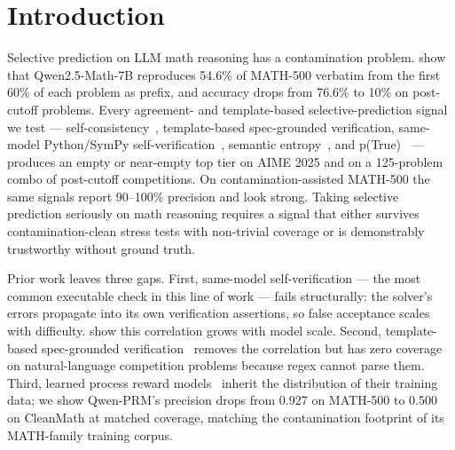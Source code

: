 \documentclass{article}
\renewcommand{\headrulewidth}{0pt}%
\begin{document}
\printAffiliationsAndNotice{}

\thispagestyle{icml}
\pagestyle{icml}
\fancyhf{}
\renewcommand{\headrulewidth}{0pt}

\section{Introduction}

Selective prediction on LLM math reasoning has a contamination problem. \citet{wu2025contam} show that Qwen2.5-Math-7B reproduces 54.6\% of MATH-500 verbatim from the first 60\% of each problem as prefix, and accuracy drops from 76.6\% to 10\% on post-cutoff problems. Every agreement- and template-based selective-prediction signal we test --- self-consistency~\citep{wang2023selfconsistency}, template-based spec-grounded verification, same-model Python/SymPy self-verification~\citep{exever}, semantic entropy~\citep{kuhn2023semantic, farquhar2024nature}, and p(True)~\citep{kadavath2022} --- produces an empty or near-empty top tier on AIME 2025 and on a 125-problem combo of post-cutoff competitions. On contamination-assisted MATH-500 the same signals report 90--100\% precision and look strong. Taking selective prediction seriously on math reasoning requires a signal that either survives contamination-clean stress tests with non-trivial coverage or is demonstrably trustworthy without ground truth.

Prior work leaves three gaps. First, same-model self-verification --- the most common executable check in this line of work --- fails structurally: the solver's errors propagate into its own verification assertions, so false acceptance scales with difficulty. \citet{kim2025correlated} show this correlation grows with model scale. Second, template-based spec-grounded verification~\citep{dtv2024} removes the correlation but has zero coverage on natural-language competition problems because regex cannot parse them. Third, learned process reward models~\citep{qwenprm2025, skyworkprm2024} inherit the distribution of their training data; we show Qwen-PRM's precision drops from 0.927 on MATH-500 to 0.500 on CleanMath at matched coverage, matching the contamination footprint of its MATH-family training corpus.
\end{document}
